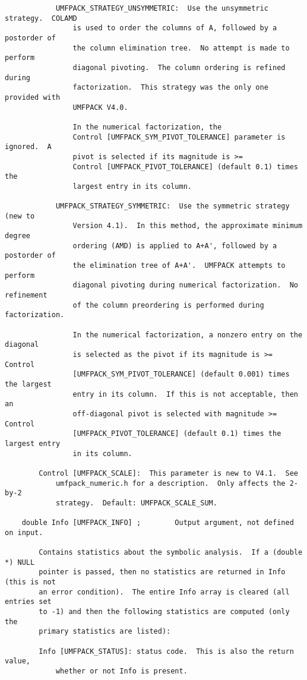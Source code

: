 \documentclass[11pt]{article}
\begin{document}
{\begin{verbatim}
            UMFPACK_STRATEGY_UNSYMMETRIC:  Use the unsymmetric strategy.  COLAMD
                is used to order the columns of A, followed by a postorder of
                the column elimination tree.  No attempt is made to perform
                diagonal pivoting.  The column ordering is refined during
                factorization.  This strategy was the only one provided with
                UMFPACK V4.0.

                In the numerical factorization, the
                Control [UMFPACK_SYM_PIVOT_TOLERANCE] parameter is ignored.  A
                pivot is selected if its magnitude is >=
                Control [UMFPACK_PIVOT_TOLERANCE] (default 0.1) times the
                largest entry in its column.

            UMFPACK_STRATEGY_SYMMETRIC:  Use the symmetric strategy (new to
                Version 4.1).  In this method, the approximate minimum degree
                ordering (AMD) is applied to A+A', followed by a postorder of
                the elimination tree of A+A'.  UMFPACK attempts to perform
                diagonal pivoting during numerical factorization.  No refinement
                of the column preordering is performed during factorization.

                In the numerical factorization, a nonzero entry on the diagonal
                is selected as the pivot if its magnitude is >= Control
                [UMFPACK_SYM_PIVOT_TOLERANCE] (default 0.001) times the largest
                entry in its column.  If this is not acceptable, then an
                off-diagonal pivot is selected with magnitude >= Control
                [UMFPACK_PIVOT_TOLERANCE] (default 0.1) times the largest entry
                in its column.

        Control [UMFPACK_SCALE]:  This parameter is new to V4.1.  See
            umfpack_numeric.h for a description.  Only affects the 2-by-2
            strategy.  Default: UMFPACK_SCALE_SUM.

    double Info [UMFPACK_INFO] ;        Output argument, not defined on input.

        Contains statistics about the symbolic analysis.  If a (double *) NULL
        pointer is passed, then no statistics are returned in Info (this is not
        an error condition).  The entire Info array is cleared (all entries set
        to -1) and then the following statistics are computed (only the
        primary statistics are listed):

        Info [UMFPACK_STATUS]: status code.  This is also the return value,
            whether or not Info is present.


\end{verbatim}}
\end{document}
